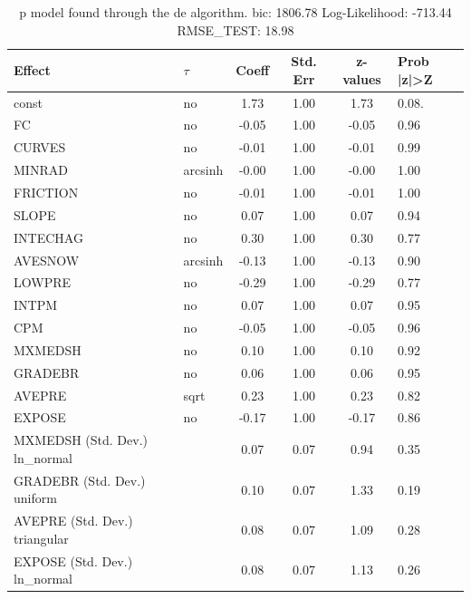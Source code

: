 \begin{table}
	\caption{p model found through the de algorithm. bic: 1806.78 Log-Likelihood: -713.44 RMSE_TEST: 18.98}
	\begin{center}
		\begin{tabular}{|l|l|c|c|c|l|}
			\hline
			Effect & $\tau$ & Coeff & Std. Err & z-values & Prob |z|>Z \\
			\hline
			const & no & 1.73 & 1.00 & 1.73 & 0.08. \\
			\hline
			FC & no & -0.05 & 1.00 & -0.05 & 0.96 \\
			\hline
			CURVES & no & -0.01 & 1.00 & -0.01 & 0.99 \\
			\hline
			MINRAD & arcsinh & -0.00 & 1.00 & -0.00 & 1.00 \\
			\hline
			FRICTION & no & -0.01 & 1.00 & -0.01 & 1.00 \\
			\hline
			SLOPE & no & 0.07 & 1.00 & 0.07 & 0.94 \\
			\hline
			INTECHAG & no & 0.30 & 1.00 & 0.30 & 0.77 \\
			\hline
			AVESNOW & arcsinh & -0.13 & 1.00 & -0.13 & 0.90 \\
			\hline
			LOWPRE & no & -0.29 & 1.00 & -0.29 & 0.77 \\
			\hline
			INTPM & no & 0.07 & 1.00 & 0.07 & 0.95 \\
			\hline
			CPM & no & -0.05 & 1.00 & -0.05 & 0.96 \\
			\hline
			MXMEDSH & no & 0.10 & 1.00 & 0.10 & 0.92 \\
			\hline
			GRADEBR & no & 0.06 & 1.00 & 0.06 & 0.95 \\
			\hline
			AVEPRE & sqrt & 0.23 & 1.00 & 0.23 & 0.82 \\
			\hline
			EXPOSE & no & -0.17 & 1.00 & -0.17 & 0.86 \\
			\hline
			MXMEDSH (Std. Dev.) ln_normal &  & 0.07 & 0.07 & 0.94 & 0.35 \\
			\hline
			GRADEBR (Std. Dev.) uniform &  & 0.10 & 0.07 & 1.33 & 0.19 \\
			\hline
			AVEPRE (Std. Dev.) triangular &  & 0.08 & 0.07 & 1.09 & 0.28 \\
			\hline
			EXPOSE (Std. Dev.) ln_normal &  & 0.08 & 0.07 & 1.13 & 0.26 \\
			\hline
		\end{tabular}
	\end{center}
\end{table}